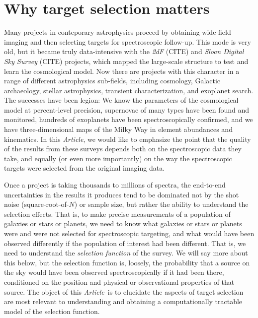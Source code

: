 \documentclass[modern]{aastex62}
\newcommand{\documentname}{\textsl{Article}}
\newcommand{\project}[1]{\textsl{#1}}
\begin{document}

\section{Why target selection matters}

Many projects in conteporary astrophysics proceed by obtaining
wide-field imaging and then selecting targets for spectroscopic
follow-up.
This mode is very old, but it became truly data-intensive with
the \project{2dF} (CITE) and \project{Sloan Digital Sky Survey} (CITE)
projects, which mapped the large-scale structure to test and learn the
cosmological model.
Now there are projects with this character in a range of different
astrophysics sub-fields, including cosmology, Galactic archaeology,
stellar astrophysics, transient characterization, and exoplanet search.
The successes have been legion:
We know the parameters of the cosmological model at percent-level
precision, supernovae of many types have been found and monitored,
hundreds of exoplanets have been spectroscopically confirmed,
and we have three-dimensional maps of the Milky Way in
element abundances and kinematics.
In this \documentname, we would like to emphasize the point that the
quality of the results from these surveys depends both on the
spectroscopic data they take, and equally (or even more importantly)
on the way the spectroscopic targets were selected from the original
imaging data.

Once a project is taking thousands to millions of spectra, the
end-to-end uncertainties in the results it produces tend to be
dominated not by the shot noise (square-root-of-$N$) or sample size,
but rather the ability to understand the selection effects.
That is, to make precise measurements of a population of galaxies or
stars or planets, we need to know what galaxies or stars or planets
were and were not selected for spectroscopic targeting, and what would
have been observed differently if the population of interest had been
different.
That is, we need to understand the \emph{selection function} of the
survey.
We will say more about this below, but the selection function is,
loosely, the probability that a source on the sky would have been
observed spectroscopically if it had been there, conditioned on the
position and physical or observational properties of that source.
The object of this \documentname\ is to elucidate the aspects of
target selection are most relevant to understanding and obtaining a
computationally tractable model of the selection function.
\end{document}
